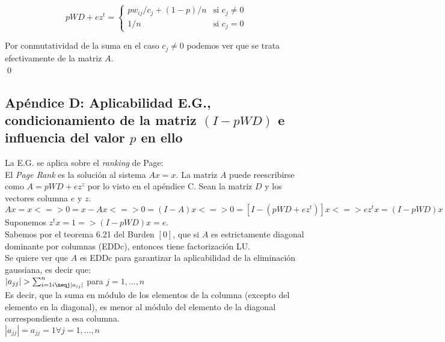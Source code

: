 		\[
			        pWD+ez^{t} = 	\begin{cases}
							pw_{ij}/c_j+(1-p)/n & \text{si } c_{j} \neq 0 \\
								     1   /n & \text{si } c_{j}   =  0
						\end  {cases}
		\]

		Por conmutatividad de la suma en el caso $c_j \neq 0$ podemos ver que se trata efectivamente de la matriz $A$. \\

		\qed

	\clearpage

	\subsection{Apéndice D: Aplicabilidad E.G., condicionamiento de la matriz $(I-pWD)$ e influencia del valor $p$ en ello}

		La E.G. se aplica sobre el \textit{ranking} de Page: \\

		El \textit{Page Rank} es la solución al sistema $Ax=x$. La matriz $A$ puede reescribirse como $A=pWD+ez^{z}$ por lo visto en el apéndice C. Sean la matriz $D$ y los vectores columna $e$ y $z$. \\

		$Ax=x <=> 0 = x-Ax <=> 0 = (I-A)x <=> 0 = [I - (pWD+ez^{t})]x <=> ez^{t}x = (I-pWD)x$ \\

		Suponemos $z^{t}x = 1 => (I-pWD)x = e$. \\

		Sabemos por el teorema 6.21 del Burden $[0]$, que si $A$ es estrictamente diagonal dominante por columnas (EDDc), entonces tiene factorización LU. \\ %

		Se quiere ver que $A$ es EDDc para garantizar la aplicabilidad de la eliminación gaussiana, es decir que: \\

		$|a_{jj}| > \sum^{n}_{i=1\\i\neqj |a_{ij}|}$ para $j = 1, \hdots, n$ \\

		Es decir, que la suma en módulo de los elementos de la columna (excepto del elemento en la diagonal), es menor al módulo del elemento de la diagonal correspondiente a esa columna. \\

		$|a_{jj}| = a_{jj} = 1 \forall j = 1, \hdots, n$ \\

